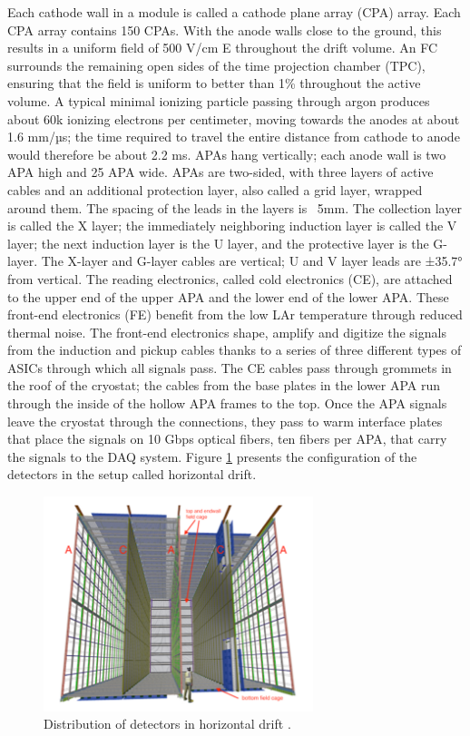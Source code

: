 \documentclass[a4paper,10pt,epsfig,epsf,amsfonts,amsmath]{article}
\begin{document}
Each cathode wall in a module is called a cathode plane array (CPA) array. Each CPA array contains 150 CPAs. With the anode walls close to the ground, this results in a uniform field of 500 V/cm E throughout the drift volume. An FC surrounds the remaining open sides of the time projection chamber (TPC), ensuring that the field is uniform to better than 1\% throughout the active volume. A typical minimal ionizing particle passing through argon produces about 60k ionizing electrons per centimeter, moving towards the anodes at about 1.6 mm/µs; the time required to travel the entire distance from cathode to anode would therefore be about 2.2 ms. APAs hang vertically; each anode wall is two APA high and 25 APA wide. APAs are two-sided, with three layers of active cables and an additional protection layer, also called a grid layer, wrapped around them. The spacing of the leads in the layers is ~5mm. The collection layer is called the X layer; the immediately neighboring induction layer is called the V layer; the next induction layer is the U layer, and the protective layer is the G-layer. The X-layer and G-layer cables are vertical; U and V layer leads are ±35.7° from vertical. The reading electronics, called cold electronics (CE), are attached to the upper end of the upper APA and the lower end of the lower APA. These front-end electronics (FE) benefit from the low LAr temperature through reduced thermal noise. The front-end electronics shape, amplify and digitize the signals from the induction and pickup cables thanks to a series of three different types of ASICs through which all signals pass. The CE cables pass through grommets in the roof of the cryostat; the cables from the base plates in the lower APA run through the inside of the hollow APA frames to the top. Once the APA signals leave the cryostat through the connections, they pass to warm interface plates that place the signals on 10 Gbps optical fibers, ten fibers per APA, that carry the signals to the DAQ system. Figure \ref{Fig_X1} presents the configuration of the detectors in the setup called horizontal drift.

\begin{figure}[hbtp]
\centering
\includegraphics[width=0.7\textwidth]{Hori_Drift.png}
\caption{Distribution of detectors in horizontal drift \cite{Abi_2020}.}
\label{Fig_X1}
\end{figure}
\end{document}
